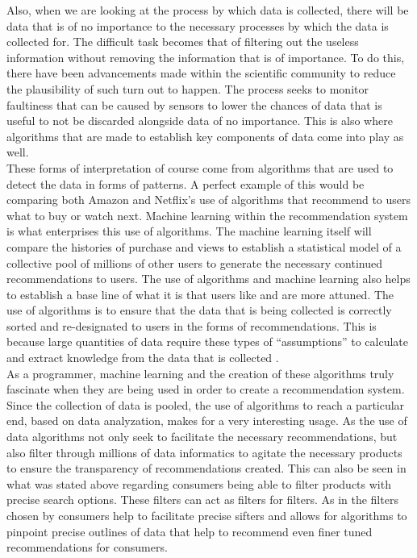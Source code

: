 \documentclass[sigconf]{acmart}
\begin{document}
Also, when we are looking at the process by which data is collected, there will be data that is of no importance to the necessary processes by which the data is collected for. The difficult task becomes that of filtering out the useless information without removing the information that is of importance. To do this, there have been advancements made within the scientific community to reduce the plausibility of such turn out to happen. The process seeks to monitor faultiness that can be caused by sensors to lower the chances of data that is useful to not be discarded alongside data of no importance. This is also where algorithms that are made to establish key components of data come into play as well. \\

These forms of interpretation of course come from algorithms that are used to detect the data in forms of patterns. A perfect example of this would be comparing both Amazon and Netflix’s use of algorithms that recommend to users what to buy or watch next. Machine learning within the recommendation system is what enterprises this use of algorithms. The machine learning itself will compare the histories of purchase and views to establish a statistical model of a collective pool of millions of other users to generate the necessary continued recommendations to users. The use of algorithms and machine learning also helps to establish a base line of what it is that users like and are more attuned. The use of algorithms is to ensure that the data that is being collected is correctly sorted and re-designated to users in the forms of recommendations. This is because large quantities of data require these types of “assumptions” to calculate and extract knowledge from the data that is collected \cite{3}.\\

As a programmer, machine learning and the creation of these algorithms truly fascinate when they are being used in order to create a recommendation system. Since the collection of data is pooled, the use of algorithms to reach a particular end, based on data analyzation, makes for a very interesting usage. As the use of data algorithms not only seek to facilitate the necessary recommendations, but also filter through millions of data informatics to agitate the necessary products to ensure the transparency of recommendations created. This can also be seen in what was stated above regarding consumers being able to filter products with precise search options. These filters can act as filters for filters. As in the filters chosen by consumers help to facilitate precise sifters and allows for algorithms to pinpoint precise outlines of data that help to recommend even finer tuned recommendations for consumers. \\
\end{document}

